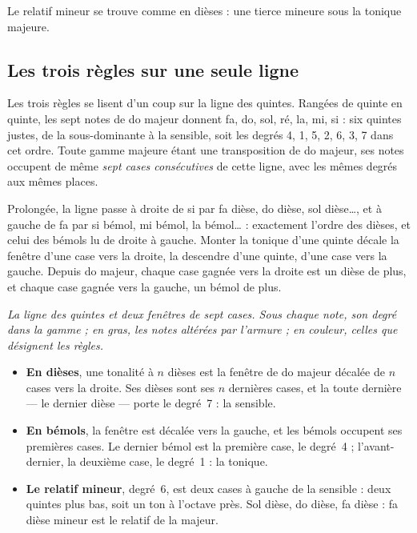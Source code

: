 \documentclass[a4paper,11pt]{article}
\begin{document}
Le relatif mineur se trouve comme en dièses : une tierce mineure sous la
tonique majeure.

\subsection{Les trois règles sur une seule ligne}

Les trois règles se lisent d'un coup sur la ligne des quintes. Rangées de quinte
en quinte, les sept notes de do majeur donnent fa, do, sol, ré, la, mi, si :
six quintes justes, de la sous-dominante à la sensible, soit les degrés 4, 1, 5,
2, 6, 3, 7 dans cet ordre. Toute gamme majeure étant une transposition de do
majeur, ses notes occupent de même \emph{sept cases consécutives} de cette
ligne, avec les mêmes degrés aux mêmes places.

Prolongée, la ligne passe à droite de si par fa dièse, do dièse, sol dièse…, et
à gauche de fa par si bémol, mi bémol, la bémol… : exactement l'ordre des
dièses, et celui des bémols lu de droite à gauche. Monter la tonique d'une
quinte décale la fenêtre d'une case vers la droite, la descendre d'une quinte,
d'une case vers la gauche. Depuis do majeur, chaque case gagnée vers la droite
est un dièse de plus, et chaque case gagnée vers la gauche, un bémol de plus.

\begin{center}
\par\vspace{4pt}
{\small\itshape\color{mygray} La ligne des quintes et deux fenêtres de sept
cases. Sous chaque note, son degré dans la gamme ; en gras, les notes altérées
par l'armure ; en couleur, celles que désignent les règles.}
\end{center}

\begin{itemize}
  \item \textbf{En dièses}, une tonalité à $n$ dièses est la fenêtre de do
    majeur décalée de $n$ cases vers la droite. Ses dièses sont ses $n$
    dernières cases, et la toute dernière — le dernier dièse — porte le
    degré~7 : la sensible.
  \item \textbf{En bémols}, la fenêtre est décalée vers la gauche, et les
    bémols occupent ses premières cases. Le dernier bémol est la première case,
    le degré~4 ; l'avant-dernier, la deuxième case, le degré~1 : la tonique.
  \item \textbf{Le relatif mineur}, degré~6, est deux cases à gauche de la
    sensible : deux quintes plus bas, soit un ton à l'octave près. Sol dièse,
    do dièse, fa dièse : fa dièse mineur est le relatif de la majeur.
\end{itemize}
\end{document}
